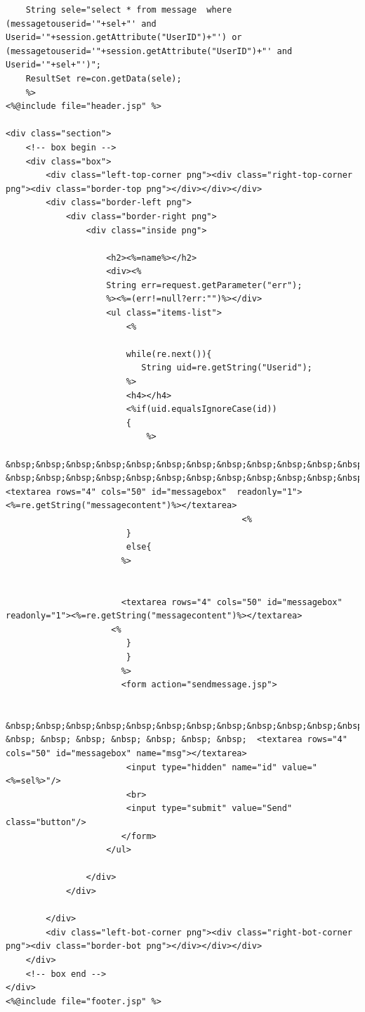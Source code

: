 \documentclass[a4paper,12pt]{article}
\begin{document}
\begin{verbatim}
    String sele="select * from message  where (messagetouserid='"+sel+"' and Userid='"+session.getAttribute("UserID")+"') or (messagetouserid='"+session.getAttribute("UserID")+"' and Userid='"+sel+"')";
    ResultSet re=con.getData(sele);
    %>
<%@include file="header.jsp" %>

<div class="section">
    <!-- box begin -->
    <div class="box">
        <div class="left-top-corner png"><div class="right-top-corner png"><div class="border-top png"></div></div></div>
        <div class="border-left png">
            <div class="border-right png">
                <div class="inside png">
                    
                    <h2><%=name%></h2>
                    <div><%
                    String err=request.getParameter("err");
                    %><%=(err!=null?err:"")%></div>
                    <ul class="items-list">
                        <%
                            
                        while(re.next()){
                           String uid=re.getString("Userid");
                        %>
                        <h4></h4>
                        <%if(uid.equalsIgnoreCase(id))
                        {
                            %>
                     &nbsp;&nbsp;&nbsp;&nbsp;&nbsp;&nbsp;&nbsp;&nbsp;&nbsp;&nbsp;&nbsp;&nbsp;&nbsp;&nbsp;  &nbsp;&nbsp;&nbsp;&nbsp;&nbsp;&nbsp;&nbsp;&nbsp;&nbsp;&nbsp;&nbsp;&nbsp;&nbsp;&nbsp;&nbsp;&nbsp;&nbsp;&nbsp;&nbsp;&nbsp;  <textarea rows="4" cols="50" id="messagebox"  readonly="1"><%=re.getString("messagecontent")%></textarea>   
                                               <%
                        }
                        else{
                       %>
                     
                         
                       <textarea rows="4" cols="50" id="messagebox"  readonly="1"><%=re.getString("messagecontent")%></textarea>
                     <%
                        }
                        }
                       %> 
                       <form action="sendmessage.jsp">
                           
                        &nbsp;&nbsp;&nbsp;&nbsp;&nbsp;&nbsp;&nbsp;&nbsp;&nbsp;&nbsp;&nbsp;&nbsp;&nbsp;&nbsp;&nbsp;&nbsp;&nbsp;&nbsp;&nbsp;&nbsp; &nbsp; &nbsp; &nbsp; &nbsp; &nbsp; &nbsp; &nbsp;  <textarea rows="4" cols="50" id="messagebox" name="msg"></textarea>
                        <input type="hidden" name="id" value="<%=sel%>"/>
                        <br>
                        <input type="submit" value="Send" class="button"/>
                       </form>
                    </ul>
                      
                </div>
            </div>
             
        </div>
        <div class="left-bot-corner png"><div class="right-bot-corner png"><div class="border-bot png"></div></div></div>
    </div>
    <!-- box end -->
</div>
<%@include file="footer.jsp" %>

\end{verbatim}
\end{document}

